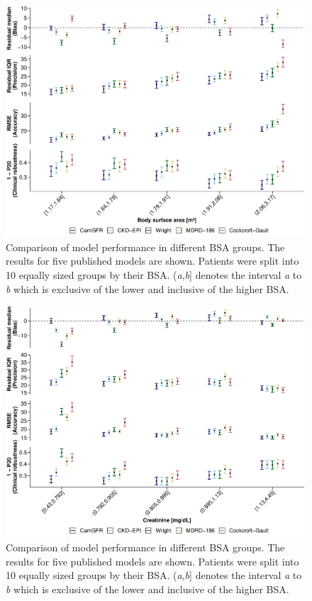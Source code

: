 \documentclass[11pt,]{article}
\begin{document}
\begin{figure}
\centering
\includegraphics{1_Validation_nonIDMS_resubmission_files/figure-latex/PLOT_performance_BSA-1.pdf}
\caption{\label{fig:performace_BSA}Comparison of model performance in
different BSA groups. The results for five published models are shown.
Patients were split into 10 equally sized groups by their BSA.
(\emph{a},\emph{b}{]} denotes the interval \emph{a} to \emph{b} which is
exclusive of the lower and inclusive of the higher BSA.}
\end{figure}

\begin{figure}
\centering
\includegraphics{1_Validation_nonIDMS_resubmission_files/figure-latex/PLOT_performance_Creat-1.pdf}
\caption{\label{fig:performace_Creat}Comparison of model performance in
different BSA groups. The results for five published models are shown.
Patients were split into 10 equally sized groups by their BSA.
(\emph{a},\emph{b}{]} denotes the interval \emph{a} to \emph{b} which is
exclusive of the lower and inclusive of the higher BSA.}
\end{figure}
\end{document}
